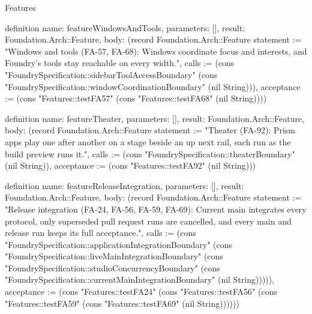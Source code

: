\begin{lexlean}{Features}
\begin{semanticmodule}
definition{
  name: featureWindowsAndTools,
  parameters: [],
  result: Foundation.Arch::Feature,
  body: (record Foundation.Arch::Feature {statement := "Windows and tools (FA-57, FA-68): Windows coordinate focus and interests, and Foundry's tools stay reachable on every width.", calls := (cons "FoundrySpecification::sidebarToolAccessBoundary" (cons "FoundrySpecification::windowCoordinationBoundary" (nil String))), acceptance := (cons "Features::testFA57" (cons "Features::testFA68" (nil String)))})
}

definition{
  name: featureTheater,
  parameters: [],
  result: Foundation.Arch::Feature,
  body: (record Foundation.Arch::Feature {statement := "Theater (FA-92): Prism apps play one after another on a stage beside an up next rail, each run as the build preview runs it.", calls := (cons "FoundrySpecification::theaterBoundary" (nil String)), acceptance := (cons "Features::testFA92" (nil String))})
}

definition{
  name: featureReleaseIntegration,
  parameters: [],
  result: Foundation.Arch::Feature,
  body: (record Foundation.Arch::Feature {statement := "Release integration (FA-24, FA-56, FA-59, FA-69): Current main integrates every protocol, only superseded pull request runs are cancelled, and every main and release run keeps its full acceptance.", calls := (cons "FoundrySpecification::applicationIntegrationBoundary" (cons "FoundrySpecification::liveMainIntegrationBoundary" (cons "FoundrySpecification::studioConcurrencyBoundary" (cons "FoundrySpecification::currentMainIntegrationBoundary" (nil String))))), acceptance := (cons "Features::testFA24" (cons "Features::testFA56" (cons "Features::testFA59" (cons "Features::testFA69" (nil String)))))})
}


\end{semanticmodule}
\end{lexlean}
